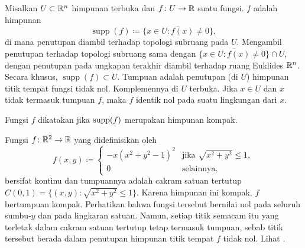 Misalkan $U \subset {\mathbb{R}}^n$ himpunan terbuka dan $f \colon U \to {\mathbb{R}}$ suatu
fungsi. \emph{} $f$ adalah himpunan
\begin{equation*}
\operatorname{supp} (f) \coloneqq
\overline{
\{ x \in U : f(x) \neq 0 \}
} ,
\end{equation*}
di mana penutupan diambil terhadap topologi subruang pada $U$. Mengambil
penutupan terhadap topologi subruang sama dengan
$\overline{
\{ x \in U : f(x) \neq 0 \}
} \cap U$, dengan penutupan pada ungkapan terakhir diambil terhadap ruang Euklides
${\mathbb{R}}^n$. Secara khusus,
$\operatorname{supp} (f) \subset U$.
Tumpuan adalah penutupan (di $U$) himpunan titik tempat fungsi tidak nol.
Komplemennya di $U$ terbuka. Jika $x \in U$ dan $x$ tidak termasuk tumpuan
$f$, maka $f$ identik nol pada suatu lingkungan dari $x$.

Fungsi $f$ dikatakan \emph{} jika $\operatorname{supp}(f)$
merupakan himpunan kompak.

\begin{example}
Fungsi $f \colon {\mathbb{R}}^2 \to {\mathbb{R}}$ yang didefinisikan oleh
\begin{equation*}
f(x,y) \coloneqq
\begin{cases}
-x{(x^2+y^2-1)}^2 & \text{jika } \sqrt{x^2+y^2} \leq 1, \\
0                 & \text{selainnya},
\end{cases}
\end{equation*}
bersifat kontinu dan tumpuannya adalah cakram satuan tertutup
$C(0,1) = \bigl\{ (x,y) : \sqrt{x^2 + y^2} \leq 1 \bigr\}$. Karena himpunan
ini kompak, $f$ bertumpuan kompak. Perhatikan bahwa fungsi tersebut bernilai
nol pada seluruh sumbu-$y$ dan pada lingkaran satuan. Namun, setiap titik
semacam itu yang terletak dalam cakram satuan tertutup tetap termasuk tumpuan,
sebab titik tersebut berada dalam penutupan himpunan titik tempat $f$ tidak
nol. Lihat .
\begin{myfigureht}
\caption{Fungsi bertumpuan kompak (kiri); tumpuannya adalah cakram satuan
tertutup (kanan).\label{fig:compsup}}
\end{myfigureht}
\end{example}

